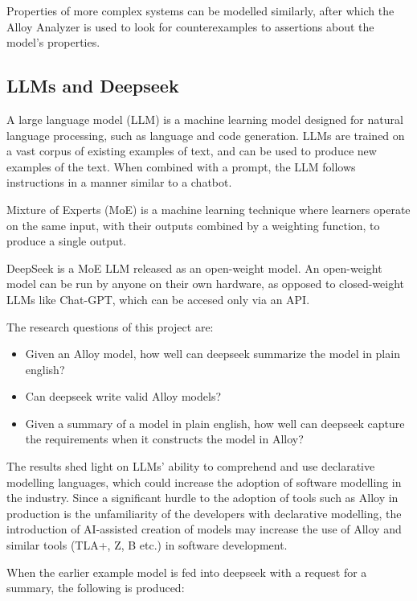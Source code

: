 \documentclass[conference]{IEEEtran}
\begin{document}
Properties of more complex systems can be modelled similarly, after which the Alloy Analyzer is used to look for counterexamples to assertions about the model's properties.


\subsection{LLMs and Deepseek}

A large language model (LLM) is a machine learning model designed for natural language processing, such as language and code generation. LLMs are trained on a vast corpus of existing examples of text, and can be used to produce new examples of the text. When combined with a prompt, the LLM follows instructions in a manner similar to a chatbot.


Mixture of Experts (MoE) is a machine learning technique where learners operate on the same input, with their outputs combined by a weighting function, to produce a single output.

DeepSeek is a MoE LLM released as an open-weight model. An open-weight model can be run by anyone on their own hardware, as opposed to closed-weight LLMs like Chat-GPT, which can be accesed only via an API. 

The research questions of this project are:

\begin{itemize}
    \item Given an Alloy model, how well can deepseek summarize the model in plain english?
    \item Can deepseek write valid Alloy models?
    \item Given a summary of a model in plain english, how well can deepseek capture the requirements when it constructs the model in Alloy?
\end{itemize}

The results shed light on LLMs' ability to comprehend and use declarative modelling languages, which could increase the adoption of software modelling in the industry. Since a significant hurdle to the adoption of tools such as Alloy in production is the unfamiliarity of the developers with declarative modelling, the introduction of AI-assisted creation of models may increase the use of Alloy and similar tools (TLA+, Z, B etc.) in software development.

When the earlier example model is fed into deepseek with a request for a summary, the following is produced:
\end{document}
